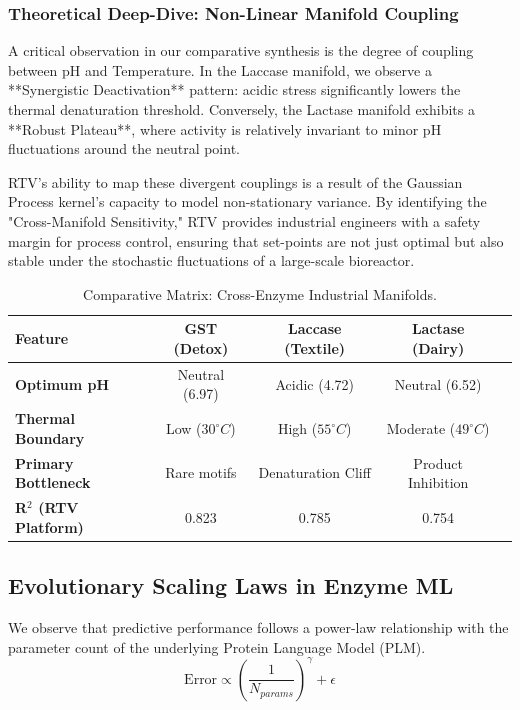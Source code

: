 \documentclass[11pt,a4paper,oneside]{article}
\begin{document}
\subsubsection{Theoretical Deep-Dive: Non-Linear Manifold Coupling}
A critical observation in our comparative synthesis is the degree of coupling between pH and Temperature. In the Laccase manifold, we observe a **Synergistic Deactivation** pattern: acidic stress significantly lowers the thermal denaturation threshold. Conversely, the Lactase manifold exhibits a **Robust Plateau**, where activity is relatively invariant to minor pH fluctuations around the neutral point. 

RTV’s ability to map these divergent couplings is a result of the Gaussian Process kernel's capacity to model non-stationary variance. By identifying the "Cross-Manifold Sensitivity," RTV provides industrial engineers with a safety margin for process control, ensuring that set-points are not just optimal but also stable under the stochastic fluctuations of a large-scale bioreactor.
\begin{table}[h]
\centering
\small
\begin{tabular}{lcccc}
\toprule
\textbf{Feature} & \textbf{GST (Detox)} & \textbf{Laccase (Textile)} & \textbf{Lactase (Dairy)} \\
\midrule
\textbf{Optimum pH} & Neutral (6.97) & Acidic (4.72) & Neutral (6.52) \\
\textbf{Thermal Boundary} & Low ($30^\circ C$) & High ($55^\circ C$) & Moderate ($49^\circ C$) \\
\textbf{Primary Bottleneck} & Rare motifs & Denaturation Cliff & Product Inhibition \\
\textbf{R$^2$ (RTV Platform)} & 0.823 & 0.785 & 0.754 \\
\bottomrule
\end{tabular}
\caption{Comparative Matrix: Cross-Enzyme Industrial Manifolds.}
\end{table}

\subsection{Evolutionary Scaling Laws in Enzyme ML}
We observe that predictive performance follows a power-law relationship with the parameter count of the underlying Protein Language Model (PLM).
\begin{equation}
    \text{Error} \propto \left( \frac{1}{N_{params}} \right)^\gamma + \epsilon
\end{equation}
\end{document}
